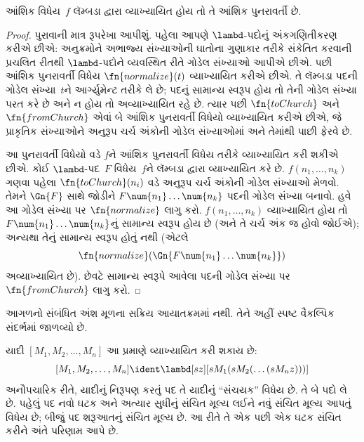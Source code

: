 \begin{thm}
   આંશિક વિધેય~$f$
  લૅમ્બડા દ્વારા વ્યાખ્યાયિત હોય તો તે આંશિક પુનરાવર્તી છે.
\end{thm}

\begin{proof}
  પુરાવાની માત્ર રૂપરેખા આપીશું. પહેલા આપણે
  $\lambd$-પદોનું અંકગણિતીકરણ કરીએ છીએ: અનુક્રમોને
  અભાજ્ય સંખ્યાઓની ઘાતોના ગુણાકાર તરીકે સંકેતિત કરવાની પ્રચલિત રીતથી
  $\lambd$-પદોને વ્યવસ્થિત રીતે ગોડેલ સંખ્યાઓ આપીએ
  છીએ. પછી આંશિક પુનરાવર્તી વિધેય
  $\fn{normalize}(t)$ વ્યાખ્યાયિત કરીએ છીએ. તે
  લૅમ્બડા પદની ગોડેલ સંખ્યા~$t$ને આર્ગ્યુમેન્ટ
  તરીકે લે છે; પદનું સામાન્ય સ્વરૂપ હોય તો તેની
  ગોડેલ સંખ્યા પરત કરે છે અને ન હોય તો
  અવ્યાખ્યાયિત રહે છે. ત્યાર પછી $\fn{toChurch}$
  અને $\fn{fromChurch}$ એવાં બે આંશિક પુનરાવર્તી
  વિધેયો વ્યાખ્યાયિત કરીએ છીએ, જે પ્રાકૃતિક સંખ્યાઓને
  અનુરૂપ ચર્ચ અંકોની ગોડેલ સંખ્યાઓમાં અને તેમાંથી
  પાછી ફેરવે છે.

  આ પુનરાવર્તી વિધેયો વડે $f$ને આંશિક પુનરાવર્તી
  વિધેય તરીકે વ્યાખ્યાયિત કરી શકીએ છીએ. કોઈ
  $\lambd$-પદ~$F$ વિધેય~$f$ને લૅમ્બડા દ્વારા વ્યાખ્યાયિત
  કરે છે. $f(n_1, \dots, n_k)$ ગણવા પહેલા
  $\fn{toChurch}(n_i)$ વડે અનુરૂપ ચર્ચ અંકોની
  ગોડેલ સંખ્યાઓ મેળવો. તેમને $\Gn{F}$ સાથે જોડીને
  $F \num{n_1}\dots\num{n_k}$ પદની ગોડેલ સંખ્યા
  બનાવો. હવે આ ગોડેલ સંખ્યા પર $\fn{normalize}$
  લાગુ કરો. $f(n_1, \dots, n_k)$ વ્યાખ્યાયિત હોય
  તો $F \num{n_1}\dots\num{n_k}$નું સામાન્ય સ્વરૂપ
  હોય છે (અને તે ચર્ચ અંક જ હોવો જોઈએ); અન્યથા
  તેનું સામાન્ય સ્વરૂપ હોતું નથી (એટલે
  \[\fn{normalize}(\Gn{F\num{n_1}\dots\num{n_k}})\]
  અવ્યાખ્યાયિત છે). છેવટે સામાન્ય સ્વરૂપે આવેલા
  પદની ગોડેલ સંખ્યા પર $\fn{fromChurch}$ લાગુ કરો.
\end{proof}
\endgroup


\OLEndChapterHook


\begin{editorial}
આગળનો સંબંધિત અંશ મૂળના સક્રિય આયાતક્રમમાં નથી. તેને અહીં સ્પષ્ટ વૈકલ્પિક સંદર્ભમાં જાળવ્યો છે.
\end{editorial}
\begingroup
\makeatletter{}\makeatother

\label{guunit:OLP-0650}


યાદી $[M_1, M_2, \ldots, M_n]$ આ પ્રમાણે
વ્યાખ્યાયિત કરી શકાય છે:
\[
  [M_1, M_2, \ldots, M_n] \ident \lambd[sz][s M_1 (s M_2 (\ldots (s M_n z)))]
\]
અનૌપચારિક રીતે, યાદીનું નિરૂપણ કરતું પદ
તે યાદીનું ``સંચયક'' વિધેય છે. તે બે પદો
લે છે. પહેલું પદ નવો ઘટક અને અત્યાર સુધીનું
સંચિત મૂલ્ય લઈને નવું સંચિત મૂલ્ય આપતું
વિધેય છે; બીજું પદ શરૂઆતનું સંચિત મૂલ્ય છે.
આ રીતે તે એક પછી એક ઘટક સંચિત કરીને અંતે
પરિણામ આપે છે.

